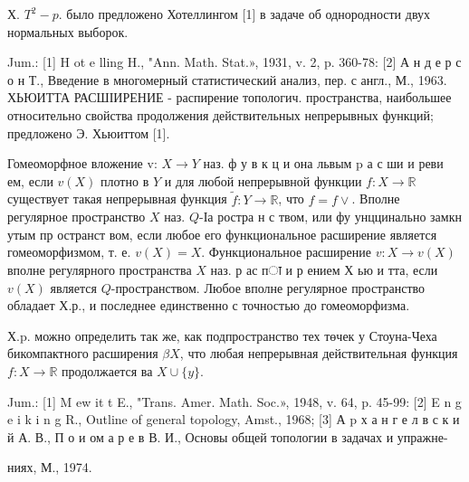 \documentclass[10pt]{article}
\begin{document}
Х. $T^{2}-p$. было предложено Хотеллингом [1] в задаче об однородности двух нормальных выборок.



Jum.: [1] H ot e lling H., "Ann. Math. Stat.», 1931, v. 2, p. 360-78: [2] А н д е р с о н Т., Введение в многомерный статистический анализ, пер. с англ., М., 1963. ХЬЮИТТА РАСШІИРЕНИЕ - распирение топологич. пространства, наибольшее относительно свойства продолжения действительных непрерывных функций; предложено Э. Хьюиттом [1].



Гомеоморфное вложение v: $X \rightarrow Y$ наз. ф у в к ц и она львым $\mathrm{p}$ а с ши и реви ем, если $v(X)$ плотно в $Y$ и для любой непрерывной функции $f: X \longrightarrow \mathbb{R}$ существует такая непрерывная функция $\tilde{f}: Y \longrightarrow \mathbb{R}$, что $f=f \vee$. Вполне регулярное пространство $X$ наз. $Q$-Іа ростра н с твом, или фу унццинально замкн утым пр остранст вом, если любое его функциональное расширение является гомеоморфизмом, т. е. $v(X)=X$. Функциональное расширение $v: X \longrightarrow v(X)$ вполне регулярного пространства $X$ наз. р ас пा и р ением Х ью и тта, если $v(X)$ является $Q$-пространством. Любое вполне регулярное пространство обладает Х.р., и последнее единственно с точностью до гомеоморфизма.



Х.p. можно определить так же, как подпространство тех төчек у Стоуна-Чеха бикомпактного расширения $\beta X$, что любая непрерывная действительная функция $f: X \longrightarrow \mathbb{R}$ продолжается ва $X \cup\{y\}$.



Jum.: [1] M ew it t E., "Trans. Amer. Math. Soc.», 1948, v. 64, p. 45-99: [2] E n g e i k i n g R., Outline of general topology, Amst., 1968; [3] А p х а н г е л в с к и й А. В., П о и ом а р е в В. И., Основы общей топологии в задачах и упражне-

ниях, М., 1974.
\end{document}
